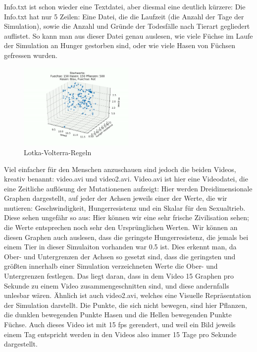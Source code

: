 \documentclass[12pt]{article}
\begin{document}
    Info.txt ist schon wieder eine Textdatei, aber diesmal eine deutlich kürzere:
        Die Info.txt hat nur 5 Zeilen: Eine Datei, die die Laufzeit (die Anzahl der Tage der
        Simulation), sowie die Anzahl und Gründe der Todesfälle nach Tierart gegliedert
        auflistet. So kann man aus dieser Datei genau auslesen, wie viele Füchse im Laufe
        der Simulation an Hunger gestorben sind, oder wie viele Hasen von Füchsen
gefressen wurden.
\newpage
\begin{figure}
        \centering
        \includegraphics[width=0.5\textwidth]{stillframe.PNG}
        \caption{Lotka-Volterra-Regeln \label{overflow}}
\end{figure}

Viel einfacher für den Menschen anzuschauen sind jedoch die beiden Videos, kreativ
    benannt: video.avi und video2.avi.
        Video.avi ist hier eine Videodatei, die eine Zeitliche auflösung der Mutationenen
        aufzeigt: Hier werden Dreidimensionale Graphen dargestellt, auf jeder der Achsen
        jeweils einer der Werte, die wir mutieren:
        Geschwindigkeit, Hungerresistenz und ein
        Skalar für den Sexualtrieb. Diese sehen ungefähr
        so aus:
        Hier können wir eine sehr frische Zivilisation
        sehen; die Werte entsprechen noch sehr den
        Ursprünglichen Werten. Wir können an diesen
        Graphen auch auslesen, dass die geringste
        Hungerresistenz, die jemals bei einem Tier in
        dieser Simulaiton vorhanden war 0.5 ist. Dies
        erkennt man, da Ober- und Untergrenzen der
        Achsen so gesetzt sind, dass die geringsten und größten innerhalb einer Simulation
        verzeichneten Werte die Ober- und Untergrenzen festlegen. Das liegt daran, dass in
        dem Video 15 Graphen pro Sekunde zu einem Video zusammengeschnitten sind, und
        diese andernfalls unlesbar wären.
        Ähnlich ist auch video2.avi, welches eine Visuelle Repräsentation der Simulation
        darstellt. Die Punkte, die sich nicht bewegen, sind hier Pflanzen, die dunklen
        bewegenden Punkte Hasen und die Hellen bewegenden Punkte Füchse. Auch dieses
        Video ist mit 15 fps gerendert, und weil ein Bild jeweils einem Tag entspricht
        werden in den Videos also immer 15 Tage pro Sekunde dargestellt.
\end{document}
